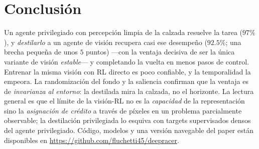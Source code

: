 \documentclass[conference]{IEEEtran}
\begin{document}
\section{Conclusi\'on}
Un agente privilegiado con percepci\'on limpia de la calzada resuelve la tarea ($97\%$), y
\emph{destilarlo} a un agente de visi\'on recupera casi ese desempe\~no ($92.5\%$; una brecha
peque\~na de unos $5$ puntos) ---con la ventaja decisiva de ser la \'unica variante de visi\'on
\emph{estable}--- y completando la vuelta en menos pasos de control. Entrenar la misma visi\'on
con RL directo es poco confiable, y la temporalidad la empeora. La randomizaci\'on del fondo y la saliencia
confirman que la ventaja es de \emph{invarianza al entorno}: la destilada mira la calzada, no el
horizonte. La lectura general es que el l\'imite de la visi\'on-RL no es la \emph{capacidad} de
la representaci\'on sino la \emph{asignaci\'on de cr\'edito} a trav\'es de p\'ixeles en un
problema parcialmente observable; la destilaci\'on privilegiada lo esquiva con targets
supervisados densos del agente privilegiado. C\'odigo, modelos y una versi\'on navegable del
paper est\'an disponibles en \url{https://github.com/fluchetti45/deepracer}.

\FloatBarrier


\end{document}
